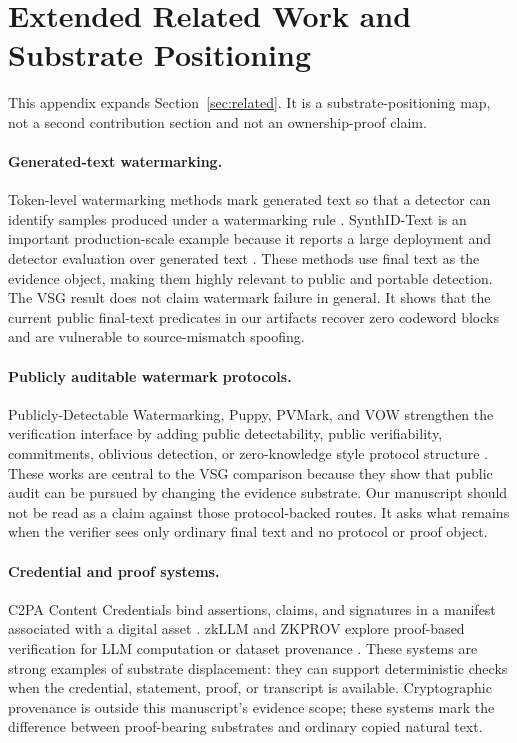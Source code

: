 \section{Extended Related Work and Substrate Positioning}
\label{app:extended-related}

This appendix expands Section~\ref{sec:related}.  It is a substrate-positioning
map, not a second contribution section and not an ownership-proof claim.

\paragraph{Generated-text watermarking.}
Token-level watermarking methods mark generated text so that a detector can
identify samples produced under a watermarking rule
\cite{kirchenbauer2023watermark,zhao2023provable,hu2024unbiased,kuditipudi2024robust,christ2023undetectable,lee2024who,chang2024postmark,huang2025waterpool,dabiriaghdam2025simmark,wouters2024optimizing,liu2024adaptive,zhu2024duwak,lau2024waterfall,jiang2025stealthink}.
SynthID-Text is an important production-scale example because it reports a
large deployment and detector evaluation over generated text
\cite{dathathri2024scalable}.  These methods use final text as the evidence
object, making them highly relevant to public and portable detection.  The VSG
result does not claim watermark failure in general.  It shows that the current
public final-text predicates in our artifacts recover zero codeword blocks and
are vulnerable to source-mismatch spoofing.

\paragraph{Publicly auditable watermark protocols.}
Publicly-Detectable Watermarking, Puppy, PVMark, and VOW strengthen the
verification interface by adding public detectability, public verifiability,
commitments, oblivious detection, or zero-knowledge style protocol structure
\cite{fairoze2023publicly,isler2023puppy,duan2025pvmark,luan2026vow}.  These
works are central to the VSG comparison because they show that public audit can
be pursued by changing the evidence substrate.  Our manuscript should not be
read as a claim against those protocol-backed routes.  It asks what remains
when the verifier sees only ordinary final text and no protocol or proof object.

\paragraph{Credential and proof systems.}
C2PA Content Credentials bind assertions, claims, and signatures in a manifest
associated with a digital asset \cite{c2pa2025spec}.  zkLLM and ZKPROV explore
proof-based verification for LLM computation or dataset provenance
\cite{sun2024zkllm,namazi2025zkprov}.  These systems are strong examples of
substrate displacement: they can support deterministic checks when the
credential, statement, proof, or transcript is available.  Cryptographic
provenance is outside this manuscript's evidence scope; these systems mark
the difference between proof-bearing substrates and ordinary copied natural
text.

